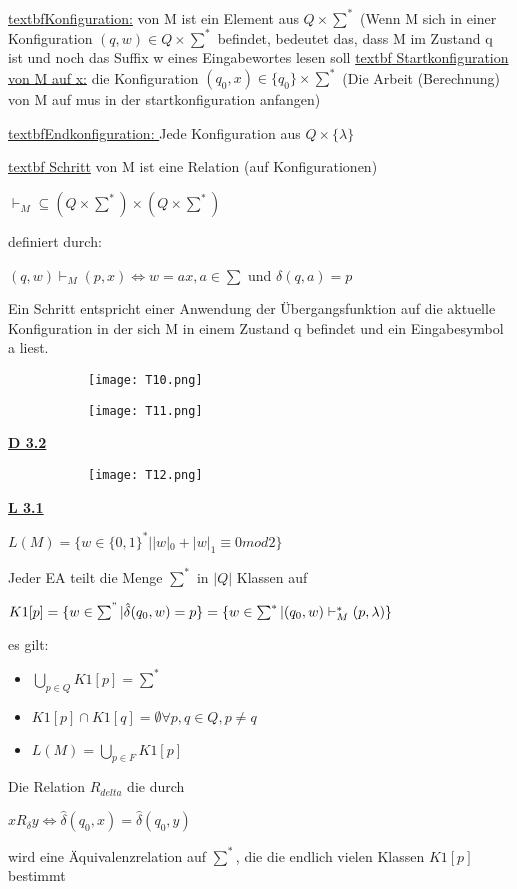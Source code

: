 \documentclass[8pt]{extreport}
\begin{document}
\underline{textbf{Konfiguration:}} von M ist ein Element aus $Q \times \sum^*$  (Wenn M sich in einer Konfiguration $(q,w) \in Q \times \sum^*$ befindet, bedeutet das, dass M im Zustand q ist und noch das Suffix w eines Eingabewortes lesen soll
\underline{textbf{ Startkonfiguration von M auf x:}} die Konfiguration $(q_0,x) \in \{q_0\} \times \sum^*$ (Die Arbeit (Berechnung) von M auf  mus in der startkonfiguration anfangen)

\underline{textbf{Endkonfiguration: }} Jede Konfiguration aus $Q \times \{\lambda\}$

\underline{textbf{ Schritt}} von M ist eine Relation (auf Konfigurationen)
\begin{center}
$\vdash_M \subseteq (Q \times \sum^*) \times (Q\times \sum^*)$
\end{center}
definiert durch:
\begin{center}
$(q,w) \vdash_M (p,x) \iff w=ax, a \in \sum$ und $\delta(q,a) = p$
\end{center}
Ein Schritt entspricht einer Anwendung der Übergangsfunktion auf die aktuelle Konfiguration in der sich M in einem Zustand q befindet und ein Eingabesymbol a liest.
\begin{figure}[H]
\centering
\begin{subfigure}[b]{0.49\linewidth}
\texttt{[image: T10.png]}
\end{subfigure}
\begin{subfigure}[b]{0.49\linewidth}
\texttt{[image: T11.png]}
\end{subfigure}
\end{figure}
\underline{\textbf{D 3.2}} 
\begin{figure}[H]
\centering
\begin{subfigure}[b]{0.49\linewidth}
\texttt{[image: T12.png]}
\end{subfigure}
\end{figure}

\underline{\textbf{L 3.1}} 
\begin{center}
$L(M) = \{w \in \{0,1\}^* | |w|_0 + |w|_1 \equiv 0 mod 2 \}$
\end{center}

Jeder EA teilt die Menge $\sum^*$ in $|Q|$ Klassen auf
\begin{center}
$K1[p] = \{w \in \sum^" | \hat{\delta}(q_0,w) = p \} = \{ w \in \sum^* | (q_0,w) \vdash_M^*(p,\lambda)\}$
\end{center}
es gilt:
\begin{itemize}
\item $\bigcup_{p\in Q}K1[p] = \sum^*$ 
\item $K1[p] \cap K1[q] = \emptyset \forall p,q \in Q, p\neq q$
\item $L(M) = \bigcup_{p\in F} K1[p]$
\end{itemize}
Die Relation $R_{delta}$ die durch
\begin{center}
$x R_{\delta} y \iff \hat{\delta}(q_0,x) = \hat{\delta}(q_0,y)$
\end{center}
wird eine Äquivalenzrelation auf $\sum^*$, die die endlich vielen Klassen $K1[p]$ bestimmt
\end{document}
